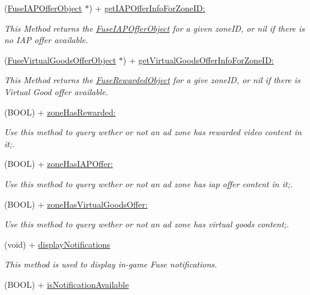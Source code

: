 \begin{DoxyCompactItemize}
(\hyperlink{interface_fuse_i_a_p_offer_object}{Fuse\+I\+A\+P\+Offer\+Object} $\ast$) + \hyperlink{interface_fuse_s_d_k_a3314236b84929bbc6fb400ac72135691}{get\+I\+A\+P\+Offer\+Info\+For\+Zone\+I\+D\+:}
\begin{DoxyCompactList}\small\item\em This Method returns the \hyperlink{interface_fuse_i_a_p_offer_object}{Fuse\+I\+A\+P\+Offer\+Object} for a given zone\+I\+D, or nil if there is no I\+A\+P offer available. \end{DoxyCompactList}\item 
(\hyperlink{interface_fuse_virtual_goods_offer_object}{Fuse\+Virtual\+Goods\+Offer\+Object} $\ast$) + \hyperlink{interface_fuse_s_d_k_a2988bfb2515b70af4aeafd4dea7ada57}{get\+Virtual\+Goods\+Offer\+Info\+For\+Zone\+I\+D\+:}
\begin{DoxyCompactList}\small\item\em This Method returns the \hyperlink{interface_fuse_rewarded_object}{Fuse\+Rewarded\+Object} for a give zone\+I\+D, or nil if there is Virtual Good offer available. \end{DoxyCompactList}\item 
(B\+O\+O\+L) + \hyperlink{interface_fuse_s_d_k_ad98a95cc63498dee7256258206808056}{zone\+Has\+Rewarded\+:}
\begin{DoxyCompactList}\small\item\em Use this method to query wether or not an ad zone has rewarded video content in it;. \end{DoxyCompactList}\item 
(B\+O\+O\+L) + \hyperlink{interface_fuse_s_d_k_adb67f99bc2972de6774949fc2849f548}{zone\+Has\+I\+A\+P\+Offer\+:}
\begin{DoxyCompactList}\small\item\em Use this method to query wether or not an ad zone has iap offer content in it;. \end{DoxyCompactList}\item 
(B\+O\+O\+L) + \hyperlink{interface_fuse_s_d_k_a898ce4e1d5235fd40627429d1f7bf138}{zone\+Has\+Virtual\+Goods\+Offer\+:}
\begin{DoxyCompactList}\small\item\em Use this method to query wether or not an ad zone has virtual goods content;. \end{DoxyCompactList}\item 
(void) + \hyperlink{interface_fuse_s_d_k_a279e4cb8e95a3e78197761156a7de50d}{display\+Notifications}
\begin{DoxyCompactList}\small\item\em This method is used to display in-\/game Fuse notifications. \end{DoxyCompactList}\item 
\hypertarget{interface_fuse_s_d_k_a23c30bc15f208daf639ece250b8a5935}{}(B\+O\+O\+L) + \hyperlink{interface_fuse_s_d_k_a23c30bc15f208daf639ece250b8a5935}{is\+Notification\+Available}\label{interface_fuse_s_d_k_a23c30bc15f208daf639ece250b8a5935}


\end{DoxyCompactItemize}
